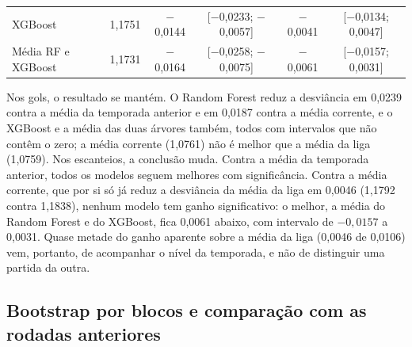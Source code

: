 \begin{table}[htb]
{\begin{tabular}{lccccc}
    XGBoost & 1,1751 & $-$0,0144 & [$-$0,0233; $-$0,0057] & $-$0,0041 & [$-$0,0134; 0,0047] \\
    Média RF e XGBoost & 1,1731 & $-$0,0164 & [$-$0,0258; $-$0,0075] & $-$0,0061 & [$-$0,0157; 0,0031] \\
    \bottomrule
  \end{tabular}%
}{%
}
\end{table}

Nos gols, o resultado se mantém. O Random Forest reduz a desviância em 0,0239 contra a média da temporada anterior e em 0,0187 contra a média corrente, e o XGBoost e a média das duas árvores também, todos com intervalos que não contêm o zero; a média corrente (1,0761) não é melhor que a média da liga (1,0759). Nos escanteios, a conclusão muda. Contra a média da temporada anterior, todos os modelos seguem melhores com significância. Contra a média corrente, que por si só já reduz a desviância da média da liga em 0,0046 (1,1792 contra 1,1838), nenhum modelo tem ganho significativo: o melhor, a média do Random Forest e do XGBoost, fica 0,0061 abaixo, com intervalo de $-0{,}0157$ a 0,0031. Quase metade do ganho aparente sobre a média da liga (0,0046 de 0,0106) vem, portanto, de acompanhar o nível da temporada, e não de distinguir uma partida da outra.

\subsection{Bootstrap por blocos e comparação com as rodadas anteriores}\label{subsec:ResBlocos}

